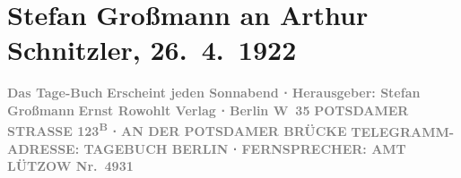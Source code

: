 

         
         \renewcommand{\erwaehntePersonen}{Personen: Felix Salten}
         \renewcommand{\erwaehnteInstitutionen}{Institutionen: Das Tage-Buch, Ernst Rowohlt Verlag, Fernsprechamt Lietzow}
         \renewcommand{\erwaehnteOrte}{Orte: Berlin, Deutschland, Potsdamerstraße, Wien, Österreich}
         \renewcommand{\erwaehnteWerke}{Werke: Das Tage-Buch, Von der kleinen Liebe}
               \section[Stefan Großmann an Arthur Schnitzler, 26. 4. 1922]{ Stefan Großmann an Arthur Schnitzler, 26. 4. 1922}\nopagebreak{}\rehead{ }\begin{ledgroupsized}[t]{13cm}\normalsize\beginnumbering \toendnotes[C]{\smallbreak\pagebreak[2]} 
\toendnotes[C]{\smallbreak}\pstart
           \noindent{}\centering{}{\pb}\textcolor{gray}{\textbf{Das Tage-Buch}}\pend
           \pstart
           \noindent{}\centering{}\textcolor{gray}{\textbf{Erscheint jeden Sonnabend ⋅ Herausgeber: Stefan Großmann}}\pend
           \pstart
           \noindent{}\centering{}\textcolor{gray}{\textbf{Ernst Rowohlt Verlag ⋅ Berlin W 35}}\pend
           \pstart
           \noindent{}\centering{}\textcolor{gray}{\textbf{POTSDAMER STRASSE 123\textsuperscript{B}
                        ⋅ AN DER POTSDAMER BRÜCKE}}\pend
           \pstart
           \noindent{}\centering{}\textcolor{gray}{\textbf{TELEGRAMM-ADRESSE: TAGEBUCH
                        BERLIN ⋅ FERNSPRECHER: AMT LÜTZOW
                     Nr. 4931}}\pend

\end{ledgroupsized}
